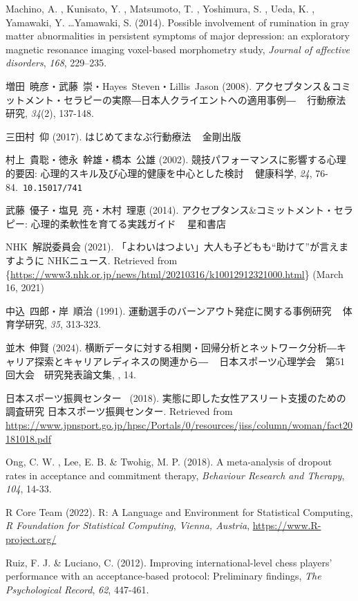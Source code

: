 \documentclass[12pt,a4paper,xelatex,ja=standard]{bxjsarticle}
\begin{document}
Machino, A. , Kunisato, Y. , Matsumoto, T. , Yoshimura, S. , Ueda, K. ,
Yamawaki, Y. \ldots Yamawaki, S. (2014). Possible involvement of
rumination in gray matter abnormalities in persistent symptoms of major
depression: an exploratory magnetic resonance imaging voxel-based
morphometry study, \emph{Journal of affective disorders}, \emph{168},
229--235.

増田~暁彦・武藤~崇・Hayes~Steven・Lillis~Jason (2008).
アクセプタンス＆コミットメント・セラピーの実際―日本人クライエントへの適用事例―
~ 行動療法研究, \emph{34}(2), 137-148.

三田村~仰 (2017). はじめてまなぶ行動療法 ~ 金剛出版

村上~貴聡・徳永~幹雄・橋本~公雄 (2002).
競技パフォーマンスに影響する心理的要因:
心理的スキル及び心理的健康を中心とした検討 ~ 健康科学, \emph{24},
76-84.~\verb|10.15017/741|

武藤~優子・塩見~亮・木村~理恵 (2014).
アクセプタンス\&コミットメント・セラピー: 心理的柔軟性を育てる実践ガイド
~ 星和書店

NHK~解説委員会 (2021).
「よわいはつよい」大人も子どもも``助けて''が言えますように NHKニュース.
Retrieved from
\{\url{https://www3.nhk.or.jp/news/html/20210316/k10012912321000.html}\}
(March 16, 2021)

中込~四郎・岸~順治 (1991). 運動選手のバーンアウト発症に関する事例研究 ~
体育学研究, \emph{35}, 313-323.

並木~伸賢 (2024).
横断データに対する相関・回帰分析とネットワーク分析―キャリア探索とキャリアレディネスの関連から―
~ 日本スポーツ心理学会　第51回大会　研究発表論文集, , 14.

日本スポーツ振興センター~ (2018).
実態に即した女性アスリート支援のための調査研究 日本スポーツ振興センター.
Retrieved from
\url{https://www.jpnsport.go.jp/hpsc/Portals/0/resources/jiss/column/woman/fact20181018.pdf}

Ong, C. W. , Lee, E. B. \& Twohig, M. P. (2018). A meta-analysis of
dropout rates in acceptance and commitment therapy,
\emph{Behaviour Research and Therapy}, \emph{104}, 14-33.

R Core Team (2022). R: A Language and Environment for Statistical
Computing, \emph{R Foundation for Statistical Computing},
\emph{Vienna, Austria}, \url{https://www.R-project.org/}

Ruiz, F. J. \& Luciano, C. (2012). Improving international-level chess
players' performance with an acceptance-based protocol: Preliminary
findings, \emph{The Psychological Record}, \emph{62}, 447-461.
\end{document}
